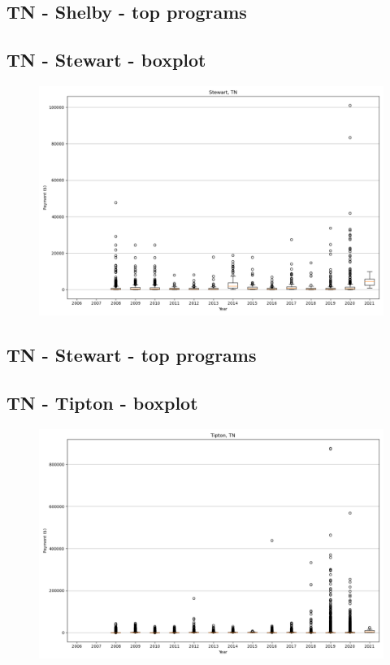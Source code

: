 \subsection*{TN - Shelby - top programs}

\newpage
\subsection*{TN - Stewart - boxplot}
\begin{figure}[h]
\centering
\includegraphics[width=7in]{../output/boxplots/counties/Stewart-TN_boxplot.png}
\end{figure}


\subsection*{TN - Stewart - top programs}

\newpage
\subsection*{TN - Tipton - boxplot}
\begin{figure}[h]
\centering
\includegraphics[width=7in]{../output/boxplots/counties/Tipton-TN_boxplot.png}
\end{figure}


